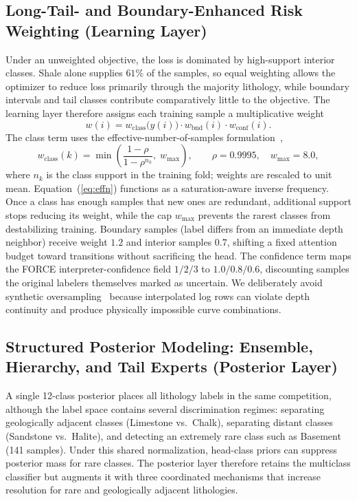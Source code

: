 \documentclass[bdcc,article,submit,pdftex,moreauthors]{Definitions/mdpi}
\begin{document}
\subsection{Long-Tail- and Boundary-Enhanced Risk Weighting (Learning Layer)}
\label{sec:learning}
Under an unweighted objective, the loss is dominated by high-support interior classes. Shale
alone supplies $61\%$ of the samples, so equal weighting allows the optimizer to reduce loss
primarily through the majority lithology, while boundary intervals and tail classes contribute
comparatively little to the objective. The learning layer therefore assigns each training
sample a multiplicative weight
\begin{equation}
w(i) = w_\text{class}\!\bigl(y(i)\bigr)\cdot w_\text{bnd}(i)\cdot w_\text{conf}(i).
\label{eq:weight}
\end{equation}
The class term uses the effective-number-of-samples
formulation~\cite{cui2019classbalanced},
\begin{equation}
w_\text{class}(k) = \min\!\left(\frac{1-\rho}{1-\rho^{n_k}},\; w_\text{max}\right),\qquad \rho=0.9995,\quad w_\text{max}=8.0,
\label{eq:effn}
\end{equation}
where $n_k$ is the class support in the training fold; weights are rescaled to unit mean.
Equation~(\ref{eq:effn}) functions as a saturation-aware inverse frequency. Once a class has
enough samples that new ones are redundant, additional support stops reducing its weight,
while the cap $w_\text{max}$ prevents the rarest classes from destabilizing training.
Boundary samples (label differs from an immediate depth neighbor) receive weight $1.2$ and
interior samples $0.7$, shifting a fixed attention budget toward transitions without
sacrificing the head. The confidence term maps the FORCE interpreter-confidence field
$1/2/3$ to $1.0/0.8/0.6$, discounting samples the original labelers themselves marked as
uncertain. We deliberately avoid synthetic oversampling~\cite{chawla2002smote} because interpolated
log rows can violate depth continuity and produce physically impossible curve combinations.

\subsection{Structured Posterior Modeling: Ensemble, Hierarchy, and Tail Experts (Posterior Layer)}
\label{sec:posterior}
A single 12-class posterior places all lithology labels in the same competition, although the
label space contains several discrimination regimes: separating geologically adjacent classes
(Limestone vs.\ Chalk), separating distant classes (Sandstone vs.\ Halite), and detecting an
extremely rare class such as Basement (141 samples). Under this shared normalization,
head-class priors can suppress posterior mass for rare classes. The posterior layer therefore
retains the multiclass classifier but augments it with three coordinated mechanisms that
increase resolution for rare and geologically adjacent lithologies.
\end{document}
